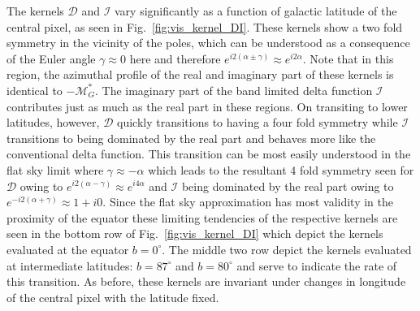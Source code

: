 \documentclass[a4paper,11pt]{article}
\def\fig#1{{Fig.~\ref{#1}}}
\begin{document}
%

The kernels $\mathcal{D}$ and $\mathcal{I}$ vary significantly as a function of galactic latitude of the central pixel, as seen in \fig{fig:vis_kernel_DI}. These kernels show a two fold symmetry in the vicinity of the poles, which can be understood as a consequence of the Euler angle $\gamma \approx 0$ here and therefore $e^{i2(\alpha \pm \gamma)} \approx e^{i2\alpha}$. Note that in this region, the azimuthal profile of the real and imaginary part of these kernels is identical to $-\mathcal{M}^*_G$.  The imaginary part of the band limited delta function $\mathcal{I}$ contributes just as much as the real part in these regions. On transiting to lower latitudes, however, $\mathcal{D}$ quickly transitions to having a four fold symmetry while $\mathcal{I}$ transitions to being dominated by the real part and behaves more like the conventional delta function. This transition can be most easily understood in the flat sky limit where $\gamma \approx -\alpha$ which leads to the resultant 4 fold symmetry seen for $\mathcal{D}$ owing to $e^{i2(\alpha - \gamma)} \approx e^{i4\alpha}$ and $\mathcal{I}$ being dominated by the real part owing to $e^{-i2(\alpha + \gamma)} \approx 1 + i0$. Since the flat sky approximation has most validity in the proximity of the equator these limiting tendencies of the respective kernels are seen in the bottom row of \fig{fig:vis_kernel_DI} which depict the kernels evaluated at the equator $b=0^{\circ}$. The middle two row depict the kernels evaluated at intermediate latitudes: $b=87^{\circ}$ and $b=80^{\circ}$ and serve to indicate the rate of this transition. As before, these kernels are invariant under changes in longitude of the central pixel with the latitude fixed.
%
\end{document}

